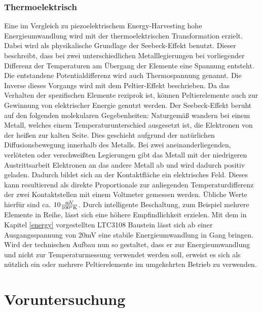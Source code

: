 \documentclass[12pt]{scrreprt} %
\begin{document}
\subsection{Thermoelektrisch}
Eine im Vergleich zu piezoelektrischem Energy-Harvesting hohe Energieumwandlung wird mit der thermoelektrischen Transformation erzielt. Dabei wird als physikalische Grundlage der Seebeck-Effekt benutzt. Dieser beschreibt, dass bei zwei unterschiedlichen Metalllegierungen bei vorliegender Differenz der Temperaturen am Übergang der Elemente eine Spannung entsteht. Die entstandene Potentialdifferenz wird auch Thermospannung \citep[vgl. S.158]{Schruefer2012} genannt. Die Inverse dieses Vorgangs wird mit dem Peltier-Effekt beschrieben. Da das Verhalten der spezifischen Elemente reziprok ist, können Peltierelemente auch zur Gewinnung von elektrischer Energie genutzt werden. \newline
Der Seebeck-Effekt beruht auf den folgenden molekularen Gegebenheiten: Naturgemäß wandern bei einem Metall, welches einem Temperaturunterschied ausgesetzt ist, die Elektronen von der heißen zur kalten Seite. Dies geschieht aufgrund der natürlichen Diffusionsbewegung innerhalb des Metalls. Bei zwei aneinanderliegenden, verlöteten oder verschweißten Legierungen gibt das Metall mit der niedrigeren Austrittsarbeit Elektronen an das andere Metall ab und wird dadurch positiv geladen. Dadurch bildet sich an der Kontaktfläche ein elektrisches Feld. Dieses kann resultierend als direkte Proportionale zur anliegenden Temperaturdifferenz der zwei Kontaktstellen mit einem Voltmeter gemessen werden. Übliche Werte hierfür sind ca. $10  \frac{\textrm{mV}}{100 \degree \textrm{K}}$. Durch intelligente Beschaltung, zum Beispiel mehrere Elemente in Reihe, lässt sich eine höhere Empfindlichkeit erzielen. Mit dem in Kapitel \vref{energy} vorgestellten LTC3108 Baustein lässt sich ab einer Ausgangsspannung von 20mV eine stabile Energieumwandlung in Gang bringen. \newline \newline
Wird der technischen Aufbau nun so gestaltet, dass er zur Energieumwandlung und nicht zur Temperaturmessung verwendet werden soll, erweist es sich als nützlich ein oder mehrere Peltierelemente im umgekehrten Betrieb zu verwenden. \citep[vgl. S.30]{Dembowski2011}
\chapter{Voruntersuchung}
\end{document}
